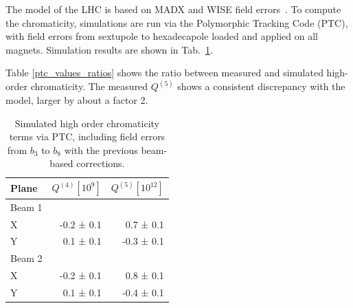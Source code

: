 The model of the LHC is based on MADX and WISE field errors~\cite{p_hagen_wise_2006}. To compute the
chromaticity, simulations are run via the Polymorphic Tracking Code (PTC), with field errors from
sextupole to hexadecapole loaded and applied on all magnets. Simulation results are shown in Tab.~\ref{ptc_values}.

Table \ref{ptc_values_ratios} shows the ratio between measured and simulated high-order chromaticity. The measured $Q^{(5)}$ shows a consistent discrepancy with the model, larger by about a factor 2.

\begin{table}[tbh]
    \centering
    \small
    \begin{tabular}{|l||r|r|}
    \hline
        Plane     &  $Q^{(4)} [10^9]$  &  $Q^{(5)} 
        [10^{12}]$ \\\hline\hline
        Beam 1    &              &               \\
        X         & -0.2 ± 0.1 & 0.7 ± 0.1  \\
        Y         &  0.1 ± 0.1 & -0.3 ± 0.1  \\ \hline
        Beam 2    &  &   \\
        X         & -0.2 ± 0.1 &  0.8 ± 0.1  \\
        Y         &  0.1 ± 0.1 & -0.4 ± 0.1 \\ \hline
    \end{tabular}
    \caption{Simulated high order chromaticity terms via PTC, including field errors from $b_3$ to $b_8$ with the previous beam-based corrections.}
    \label{ptc_values}
\end{table}

